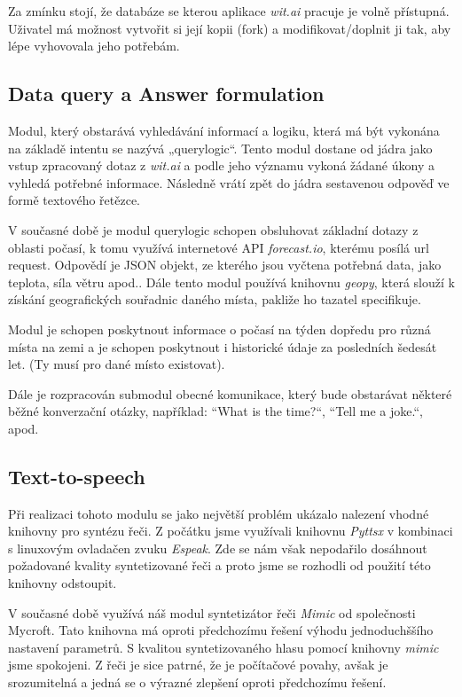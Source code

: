 \documentclass[12pt,a4paper]{article}
\begin{document}
Za zmínku stojí, že databáze se kterou aplikace \textit{wit.ai} pracuje je volně přístupná. Uživatel má možnost vytvořit si její kopii (fork) a modifikovat/doplnit ji tak, aby lépe vyhovovala jeho potřebám.

\subsection*{Data query a Answer formulation}
Modul, který obstarává vyhledávání informací a logiku, která má být vykonána na základě intentu se nazývá „querylogic“. Tento modul dostane od jádra jako vstup zpracovaný dotaz z \textit{wit.ai} a podle jeho významu vykoná žádané úkony a vyhledá potřebné informace. Následně vrátí zpět do jádra sestavenou odpověď ve formě textového řetězce.

V současné době je modul querylogic schopen obsluhovat základní dotazy z oblasti počasí, k tomu využívá internetové API \textit{forecast.io}, kterému posílá url request. Odpovědí je JSON objekt, ze kterého jsou vyčtena potřebná data, jako teplota, síla větru apod..
Dále tento modul používá knihovnu \textit{geopy}, která slouží k získání geografických souřadnic daného místa, pakliže ho tazatel specifikuje. 

Modul je schopen poskytnout informace o počasí na týden dopředu pro různá místa na zemi a je schopen poskytnout i historické údaje za posledních šedesát let. (Ty musí pro dané místo existovat).

Dále je rozpracován submodul obecné komunikace, který bude obstarávat některé běžné konverzační otázky, například:  “What is the time?“, “Tell me a joke.“, apod.
\subsection*{Text-to-speech}
Při realizaci tohoto modulu se jako největší problém ukázalo nalezení vhodné knihovny pro syntézu řeči. Z počátku jsme využívali knihovnu \textit{Pyttsx} v kombinaci s linuxovým ovladačen zvuku \textit{Espeak}. Zde se nám však nepodařilo dosáhnout požadované kvality syntetizované řeči a proto jsme se rozhodli od použití této knihovny odstoupit.

V současné době využívá náš modul syntetizátor řeči \textit{Mimic} od společnosti Mycroft. 
Tato knihovna má oproti předchozímu řešení výhodu jednoduchššího nastavení parametrů. S kvalitou syntetizovaného hlasu pomocí knihovny \textit{mimic} jsme spokojeni. Z řeči je sice patrné, že je počítačové povahy, avšak je srozumitelná a jedná se o výrazné zlepšení oproti předchozímu řešení.
\end{document}
